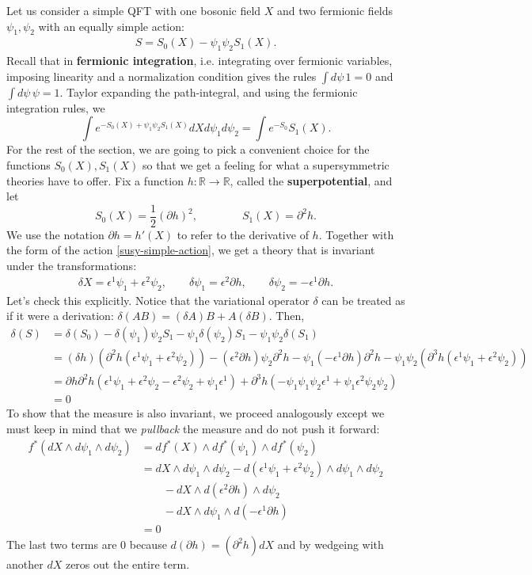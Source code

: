 \documentclass{report}
\theoremstyle{plain}
\theoremstyle{definition}
\theoremstyle{remark}
\newcommand{\di}{\partial}
\newcommand{\bR}{\mathbb{R}}
\newcommand{\FR}[2]{\frac{#1}{#2}}
\begin{document}
Let us consider a simple QFT with one bosonic field $X$ and two fermionic
fields $\psi_1,\psi_2$ with an equally simple action: 
\begin{align} S = S_0(X) - \psi_1\psi_2 S_1(X).
    \label{susy-simple-action}
\end{align}
Recall that in {\bf fermionic integration}, i.e. integrating over
fermionic variables, imposing linearity and a normalization condition
gives the rules $\int d\psi \, 1 = 0$ and $\int d\psi \, \psi = 1$.
Taylor expanding the path-integral, and using the fermionic
integration rules, we
\[ \int e^{-S_0(X)+\psi_1\psi_2S_1(X)} dXd\psi_1d\psi_2 = \int e^{-S_0}S_1(X).\]
For the rest of the section, we are going to pick a convenient choice
for the functions $S_0(X), S_1(X)$ so that we get a feeling for what a
supersymmetric theories have to offer. Fix a function $h\colon\bR\to
\bR$, called the {\bf superpotential}, and let
\[ S_0(X) = \FR{1}{2} (\di h)^2, \qquad\qquad S_1(X) = \di^2 h.\]
We use the notation $\di h = h'(X)$ to refer to the derivative of $h$.
Together with the form of the action \eqref{susy-simple-action}, we
get a theory that is invariant under the transformations:
\begin{align}
\delta X = \epsilon^1\psi_1 + \epsilon^2\psi_2,
\qquad \delta\psi_1 = \epsilon^2\di h,
\qquad \delta\psi_2 =-\epsilon^1\di h.
\label{susy-simple-variation}
\end{align}
Let's check this explicitly. Notice that the variational operator
$\delta$ can be treated as if it were a derivation: $\delta(AB) =
(\delta A)B + A(\delta B)$. Then,
\begin{align*}
\delta(S) &= \delta(S_0) - \delta(\psi_1)\psi_2S_1 -
\psi_1\delta(\psi_2)S_1 - \psi_1\psi_2\delta(S_1)\\
&= (\delta h)(\di^2 h(\epsilon^1\psi_1+\epsilon^2\psi_2))
      -(\epsilon^2\di h)\psi_2\di^2 h
      -\psi_1(-\epsilon^1\di h)\di^2 h
      -\psi_1\psi_2(\di^3 h (\epsilon^1\psi_1+\epsilon^2\psi_2))\\
&=\di h\di^2 h
(\epsilon^1\psi_1+\epsilon^2\psi_2-\epsilon^2\psi_2+\psi_1\epsilon^1)
+\di^3 h (-\psi_1\psi_1\psi_2\epsilon^1 + \psi_1\epsilon^2\psi_2\psi_2)\\
&=0
\end{align*}
To show that the measure is also invariant, we proceed analogously except
we must keep in mind that we \emph{pullback} the measure and do not push it
forward:
\begin{align*}
f^*(dX\wedge d\psi_1\wedge d\psi_2)
&= df^*(X)\wedge df^*(\psi_1) \wedge df^*(\psi_2)\\
&= dX\wedge d\psi_1\wedge d\psi_2
  -d(\epsilon^1\psi_1+\epsilon^2\psi_2)\wedge d\psi_1\wedge d\psi_2\\
  &\qquad-dX\wedge d(\epsilon^2\di h)\wedge d\psi_2\\
  &\qquad-dX\wedge d\psi_1\wedge d(-\epsilon^1\di h)\\
&= 0
\end{align*}
The last two terms are $0$ because $d(\di h) = (\di^2 h)dX$ and by wedgeing
with another $dX$ zeros out the entire term.
\end{document}

